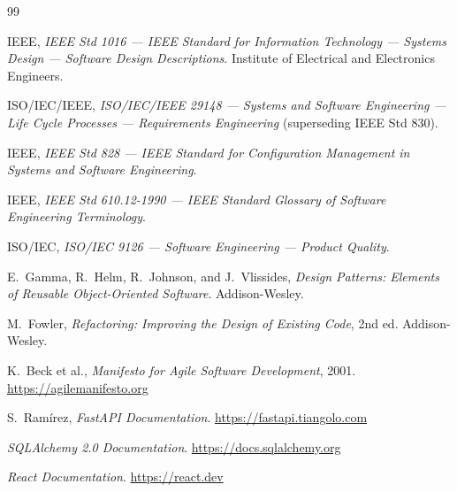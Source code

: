 \begin{thebibliography}{99}

 IEEE, \emph{IEEE Std 1016 --- IEEE Standard for Information Technology --- Systems Design --- Software Design Descriptions}. Institute of Electrical and Electronics Engineers.

 ISO/IEC/IEEE, \emph{ISO/IEC/IEEE 29148 --- Systems and Software Engineering --- Life Cycle Processes --- Requirements Engineering} (superseding IEEE Std 830).

 IEEE, \emph{IEEE Std 828 --- IEEE Standard for Configuration Management in Systems and Software Engineering}.

 IEEE, \emph{IEEE Std 610.12-1990 --- IEEE Standard Glossary of Software Engineering Terminology}.

 ISO/IEC, \emph{ISO/IEC 9126 --- Software Engineering --- Product Quality}.

 E.~Gamma, R.~Helm, R.~Johnson, and J.~Vlissides, \emph{Design Patterns: Elements of Reusable Object-Oriented Software}. Addison-Wesley.

 M.~Fowler, \emph{Refactoring: Improving the Design of Existing Code}, 2nd ed. Addison-Wesley.

 K.~Beck et al., \emph{Manifesto for Agile Software Development}, 2001. \url{https://agilemanifesto.org}

 S.~Ram\'irez, \emph{FastAPI Documentation}. \url{https://fastapi.tiangolo.com}

 \emph{SQLAlchemy 2.0 Documentation}. \url{https://docs.sqlalchemy.org}

 \emph{React Documentation}. \url{https://react.dev}

\end{thebibliography}
